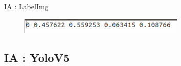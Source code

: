 \begin{frame}[allowframebreaks]{IA : LabelImg}
            \begin{figure}[H]
                \centering
                \includegraphics[width=1\linewidth]{images/labelTxt.png}
            \end{figure}
            
        \end{frame}
%
    \subsection{IA : YoloV5}
